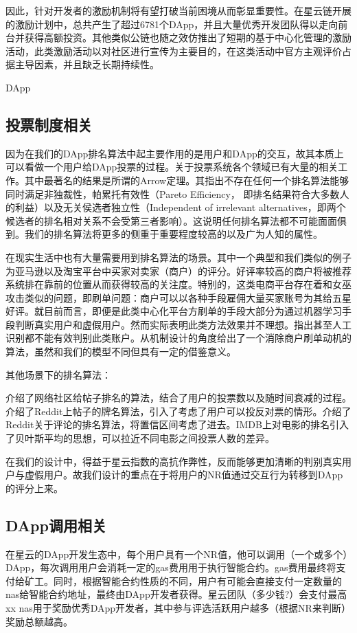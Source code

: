 因此，针对开发者的激励机制将有望打破当前困境从而彰显重要性。在星云链开展的激励计划中，总共产生了超过6781个DApp，并且大量优秀开发团队得以走向前台并获得高额投资\cite{Nabulasincentive}。其他类似公链也随之效仿推出了短期的基于中心化管理的激励活动，此类激励活动以对社区进行宣传为主要目的，在这类活动中官方主观评价占据主导因素，并且缺乏长期持续性。

		DApp
\subsection{投票制度相关}
因为在我们的DApp排名算法中起主要作用的是用户和DApp的交互，故其本质上可以看做一个用户给DApp投票的过程。关于投票系统各个领域已有大量的相关工作。其中最著名的结果是所谓的Arrow定理\cite{arrow1951extension}。其指出不存在任何一个排名算法能够同时满足非独裁性，帕累托有效性（Pareto Efficiency， 即排名结果符合大多数人的利益）以及无关侯选者独立性（Independent of irrelevant alternatives，即两个候选者的排名相对关系不会受第三者影响）。这说明任何排名算法都不可能面面俱到。我们的排名算法将更多的侧重于重要程度较高的以及广为人知的属性。

在现实生活中也有大量需要用到排名算法的场景。其中一个典型和我们类似的例子为亚马逊以及淘宝平台中买家对卖家（商户）的评分。好评率较高的商户将被推荐系统排在靠前的位置从而获得较高的关注度。特别的，这类电商平台存在着和女巫攻击类似的问题，即刷单问题：商户可以以各种手段雇佣大量买家账号为其给五星好评。就目前而言，即便是此类中心化平台方刷单的手段大部分为通过机器学习手段判断真实用户和虚假用户\cite{mukherjee2013spotting,jindal2008opinion,yoo2009comparison}。然而实际表明此类方法效果并不理想。\cite{ott2011finding}指出甚至人工识别都不能有效判别此类账户。\cite{cai2016mechanism}从机制设计的角度给出了一个消除商户刷单动机的算法，虽然和我们的模型不同但具有一定的借鉴意义。

其他场景下的排名算法：

\cite{salihefendic2010hacker}介绍了网络社区给帖子排名的算法，结合了用户的投票数以及随时间衰减的过程。\cite{salihefendic2010reddit}介绍了Reddit上帖子的牌名算法，引入了考虑了用户可以投反对票的情形。\cite{miller2009how}介绍了Reddit关于评论的排名算法，将置信区间考虑了进去。IMDB\cite{IMDB}上对电影的排名引入了贝叶斯平均的思想，可以拉近不同电影之间投票人数的差异。

在我们的设计中，得益于星云指数\cite{Nabulasyellowpaper}的高抗作弊性，反而能够更加清晰的判别真实用户与虚假用户。故我们设计的重点在于将用户的NR值通过交互行为转移到DApp的评分上来。



\subsection{DApp调用相关}
\label{subsec:2.3}
在星云的DApp开发生态中，每个用户具有一个NR值，他可以调用（一个或多个）DApp，每次调用用户会消耗一定的gas费用用于执行智能合约。gas费用最终将支付给矿工。同时，根据智能合约性质的不同，用户有可能会直接支付一定数量的nas给智能合约地址，最终由DApp开发者获得。星云团队（{\color{red}多少钱?}）会支付最高xx nas用于奖励优秀DApp开发者，其中参与评选活跃用户越多（根据NR来判断）奖励总额越高。

